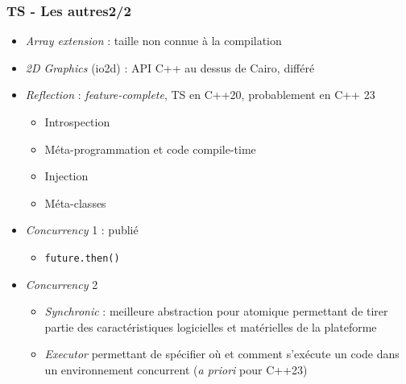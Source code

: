 \documentclass[C++.tex]{subfiles}
\begin{document}
\begin{frame}
	\frametitle{TS - Les autres\titlehfill{}2/2}
	\begin{itemize}
		\item \textit{Array extension} : taille non connue à la compilation
		\item \textit{2D Graphics} (io2d) : API C++ au dessus de Cairo, différé


		\item \textit{Reflection} : \textit{feature-complete}, TS en \og C++20\fg{}, probablement en C++ 23
		\begin{itemize}
			\item Introspection
			\item Méta-programmation et code compile-time
			\item Injection
			\item Méta-classes
		\end{itemize}


		\item \textit{Concurrency} 1 : publié
		\begin{itemize}
			\item \lstinline|future.then()|
		\end{itemize}
		\item \textit{Concurrency} 2
		\begin{itemize}
			\item \textit{Synchronic} : meilleure abstraction pour atomique permettant de tirer partie des caractéristiques logicielles et matérielles de la plateforme
			\item \textit{Executor} permettant de spécifier où et comment s'exécute un code dans un environnement concurrent (\textit{a priori} pour C++23)
		\end{itemize}
	\end{itemize}
\end{frame}
\end{document}
